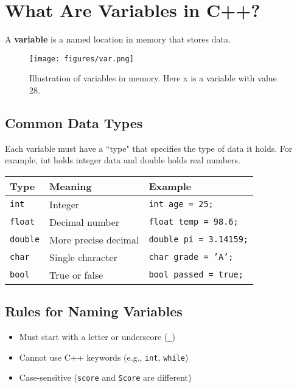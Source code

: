 \documentclass{article}
\begin{document}
\section{What Are Variables in C++?}

A \textbf{variable} is a named location in memory that stores data.



\begin{figure}[h]
    \centering
    \texttt{[image: figures/var.png]}  %
    \caption{Illustration of variables in memory. Here x is a variable with value 28.}
    \label{fig:var}
\end{figure}


\subsection*{Common Data Types}

Each variable must have a ``type" that specifies the type of data it holds. For example, int holds integer data and double holds real numbers.

\begin{center}
\begin{tabular}{|l|l|l|}
\hline
\textbf{Type} & \textbf{Meaning} & \textbf{Example} \\
\hline
\texttt{int} & Integer & \texttt{int age = 25;} \\
\texttt{float} & Decimal number & \texttt{float temp = 98.6;} \\
\texttt{double} & More precise decimal & \texttt{double pi = 3.14159;} \\
\texttt{char} & Single character & \texttt{char grade = 'A';} \\
\texttt{bool} & True or false & \texttt{bool passed = true;} \\
\hline
\end{tabular}
\end{center}

\subsection*{Rules for Naming Variables}
\begin{itemize}
    \item Must start with a letter or underscore (\texttt{\_})
    \item Cannot use C++ keywords (e.g., \texttt{int}, \texttt{while})
    \item Case-sensitive (\texttt{score} and \texttt{Score} are different)
\end{itemize}
\end{document}
